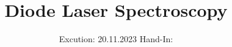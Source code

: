 

\subject{V60}
\title{Diode Laser Spectroscopy}
\date{%
  Excution: 20.11.2023
  \hspace{3em}
  Hand-In: 
}



\maketitle
\thispagestyle{empty}
\tableofcontents
\newpage
\setcounter{page}{1}







\printbibliography{}


